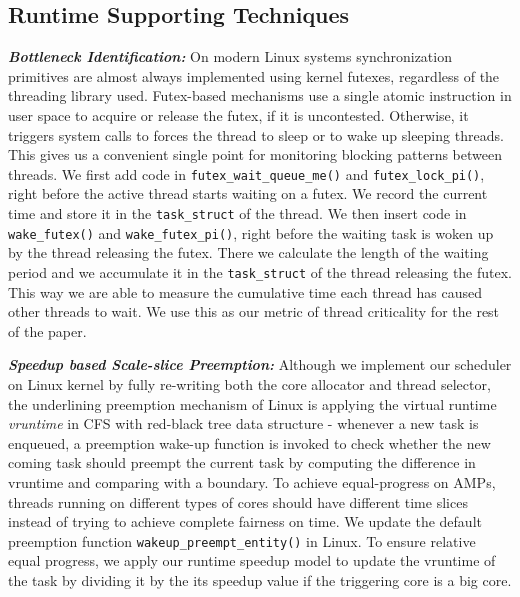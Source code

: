 \subsection{Runtime Supporting Techniques}
\textbf{\textit{Bottleneck Identification:}}
On modern Linux systems synchronization primitives are almost always implemented using kernel futexes, regardless of the threading library used. Futex-based mechanisms use a single atomic instruction in user space to acquire or release the futex, if it is uncontested. Otherwise, it triggers system calls to forces the thread to sleep or to wake up sleeping threads.
This gives us a convenient single point for monitoring blocking patterns between threads. We first add code in \texttt{futex\_wait\_queue\_me()} and \texttt{futex\_lock\_pi()}, right before the active thread starts waiting on a futex. We record the current time and store it in the \texttt{task\_struct} of the thread. We then insert code in \texttt{wake\_futex()} and \texttt{wake\_futex\_pi()}, right before the waiting task is woken up by the thread releasing the futex. There we calculate the length of the waiting period and we accumulate it in the \texttt{task\_struct} of the thread releasing the futex. This way we are able to measure the cumulative time each thread has caused other threads to wait. We use this as our metric of thread criticality for the rest of the paper.

\textbf{\textit {Speedup based Scale-slice Preemption:}} Although we implement our scheduler on Linux kernel by fully re-writing both the core allocator and thread selector, the underlining preemption mechanism of Linux is applying the virtual runtime {\it vruntime} in CFS with red-black tree data structure - whenever a new task is enqueued, a preemption wake-up function is invoked to check whether the new coming task should preempt the current task by computing the difference in vruntime and comparing with a boundary. 
To achieve equal-progress on AMPs, threads running on different types of cores should have different time slices instead of trying to achieve complete fairness on time. We update the default preemption function \texttt{wakeup\_preempt\_entity()} in Linux. To ensure relative equal progress, we apply our runtime speedup model to update the vruntime of the task by dividing it by the its speedup value if the triggering core is a big core. %

